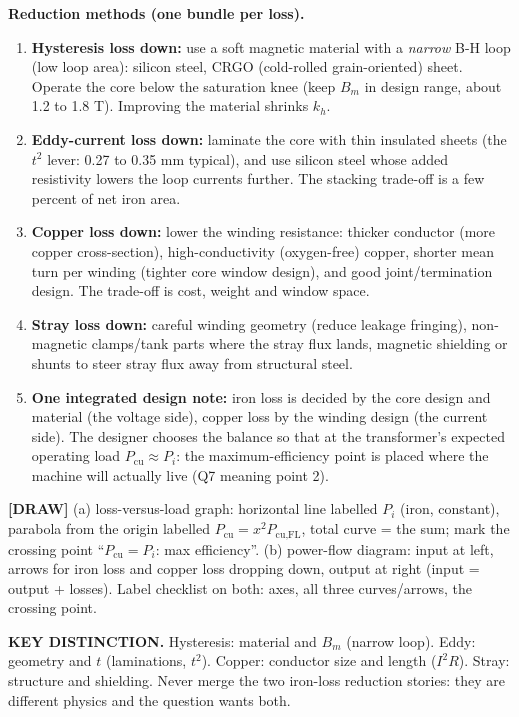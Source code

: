 \documentclass[11pt]{article}
\newcommand{\keydist}[1]{\vspace{2pt}\textbf{\color{red}KEY DISTINCTION.} #1}
\newcommand{\drawline}[1]{\textbf{\color{muted}[DRAW]} #1}
\begin{document}
\textbf{Reduction methods (one bundle per loss).}
\begin{enumerate}[label=\arabic*.]
\item \textbf{Hysteresis loss down:} use a soft magnetic material with a \emph{narrow} B-H loop (low loop area): silicon steel, CRGO (cold-rolled grain-oriented) sheet. Operate the core below the saturation knee (keep $B_m$ in design range, about 1.2 to 1.8 T). Improving the material shrinks $k_h$.
\item \textbf{Eddy-current loss down:} laminate the core with thin insulated sheets (the $t^{2}$ lever: 0.27 to 0.35 mm typical), and use silicon steel whose added resistivity lowers the loop currents further. The stacking trade-off is a few percent of net iron area.
\item \textbf{Copper loss down:} lower the winding resistance: thicker conductor (more copper cross-section), high-conductivity (oxygen-free) copper, shorter mean turn per winding (tighter core window design), and good joint/termination design. The trade-off is cost, weight and window space.
\item \textbf{Stray loss down:} careful winding geometry (reduce leakage fringing), non-magnetic clamps/tank parts where the stray flux lands, magnetic shielding or shunts to steer stray flux away from structural steel.
\item \textbf{One integrated design note:} iron loss is decided by the core design and material (the voltage side), copper loss by the winding design (the current side). The designer chooses the balance so that at the transformer's expected operating load $P_{\text{cu}} \approx P_i$: the maximum-efficiency point is placed where the machine will actually live (Q7 meaning point 2).
\end{enumerate}

\drawline{(a) loss-versus-load graph: horizontal line labelled $P_i$ (iron, constant), parabola from the origin labelled $P_{\text{cu}} = x^{2} P_{\text{cu,FL}}$, total curve = the sum; mark the crossing point ``$P_{\text{cu}} = P_i$: max efficiency''. (b) power-flow diagram: input at left, arrows for iron loss and copper loss dropping down, output at right (input = output + losses). Label checklist on both: axes, all three curves/arrows, the crossing point.}

\keydist{Hysteresis: material and $B_m$ (narrow loop). Eddy: geometry and $t$ (laminations, $t^{2}$). Copper: conductor size and length ($I^{2}R$). Stray: structure and shielding. Never merge the two iron-loss reduction stories: they are different physics and the question wants both.}
\end{document}
